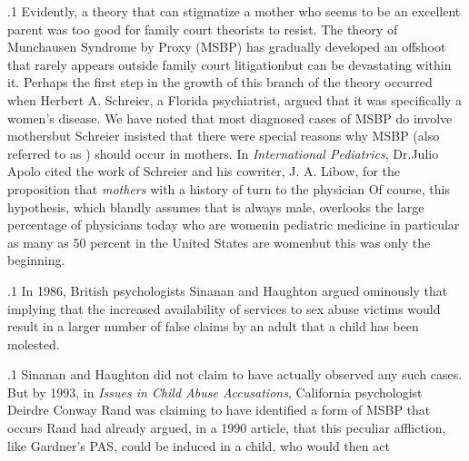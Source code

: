 \documentclass[11pt, twoside]{article}
\begin{document}
{\p.1{%
Evidently, a theory that can stigmatize a mother who seems to be an
excellent parent was too good for family court theorists to resist. The
theory of Munchausen Syndrome
by Proxy (MSBP) has gradually developed an offshoot that rarely appears
outside family court litigation\mdash{}but can be devastating within it.
Perhaps the first step in the growth of this branch of the theory occurred when Herbert A. Schreier, a Florida psychiatrist, argued that it
was specifically a women’s disease. We have noted that most diagnosed
cases of MSBP do involve mothers\mdash{}but Schreier insisted that there were
special reasons why MSBP (also referred to as ) should occur in mothers. In \textit{International Pediatrics}, Dr.\@ Julio
Apolo cited the work of Schreier and his cowriter, J. A. Libow, for the
proposition that \textit{mothers} with a history of  turn to the physician  Of course, this hypothesis,
which blandly assumes that  is always male, overlooks
the large percentage of physicians today who are women\mdash{}in pediatric
medicine in particular as many as 50 percent in the United States are
women\mdash{}but this was only the beginning.
}%

\p.1{%
In 1986, British psychologists Sinanan and Haughton argued ominously that  implying that the increased availability
of services to sex abuse victims would result in a larger number of false
claims by an adult that a child has been molested.
}%

\p.1{%
Sinanan and Haughton did not claim to have actually observed any
such cases. But by 1993, in \textit{Issues in Child Abuse
Accusations}, California psychologist Deirdre Conway Rand was claiming to have identified
a  form of MSBP that occurs  Rand
had already argued, in a 1990 article, that this peculiar affliction, like
Gardner’s PAS, could be induced in a child, who would then act 
}%

}
\end{document}
